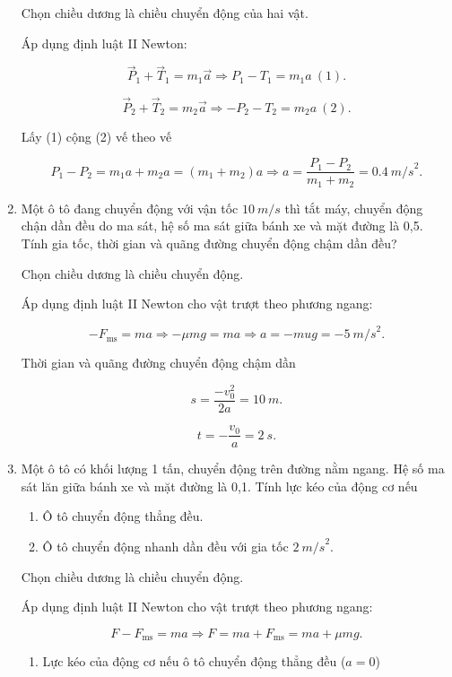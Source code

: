 \begin{enumerate}[label=\bfseries Câu \arabic*:]
{		Chọn chiều dương là chiều chuyển động của hai vật.
		
		Áp dụng định luật II Newton:
		
		$$\vec P_1 + \vec T_1 = m_1 \vec a \Rightarrow P_1 - T_1 = m_1a\ (1).$$
		
		$$\vec P_2 + \vec T_2 = m_2 \vec a \Rightarrow - P_2 - T_2 = m_2a\ (2).$$
		
		Lấy (1) cộng (2) vế theo vế
		
		$$ P_1 - P_2 = m_1 a + m_2 a = (m_1+ m_2)a \Rightarrow a = \dfrac{P_1 - P_2}{m_1 + m_2} = \SI{0,4}{m/s}^2.$$
		
	}
	\item {}
	
	
	{
		Một ô tô đang chuyển động với vận tốc $\SI{10}{m/s}$ thì tắt máy, chuyển động chận dần đều do ma sát, hệ số ma sát giữa bánh xe và mặt đường là 0,5. Tính gia tốc, thời gian và quãng đường chuyển động chậm dần đều?
	}
	
	\hideall
	{
		Chọn chiều dương là chiều chuyển động.
		
		Áp dụng định luật II Newton cho vật trượt theo phương ngang:
		
		$$- F_\text{ms} = ma \Rightarrow - \mu mg = ma \Rightarrow a = - mu g = - \SI{5}{m/s}^2.$$
		
		Thời gian và quãng đường chuyển động chậm dần
		
		$$s = \dfrac{-v_0^2}{2a} = \SI{10}{m}.$$
		
		$$ t = - \dfrac{v_0}{a} =\SI{2}{s}.$$ 
	}
	\item {}
	
	
	{
		Một ô tô có khối lượng 1 tấn, chuyển động trên đường nằm ngang. Hệ số ma sát lăn giữa bánh xe và mặt đường là 0,1. Tính lực kéo của động cơ nếu
		
		\begin{enumerate}[label=\alph*)]
			\item Ô tô chuyển động thẳng đều.
			\item Ô tô chuyển động nhanh dần đều với gia tốc $\SI{2}{m/s}^2$.
		\end{enumerate}
	}
	
	\hideall
	{
		Chọn chiều dương là chiều chuyển động.
		
		Áp dụng định luật II Newton cho vật trượt theo phương ngang:
		
		$$F - F_\text{ms} = ma \Rightarrow F = ma + F_\text{ms} = ma + \mu mg.$$
		\begin{enumerate}[label=\alph*)]
			\item  Lực kéo của động cơ nếu ô tô chuyển động thẳng đều ($a=0$)
			

\end{enumerate}}
\end{enumerate}
